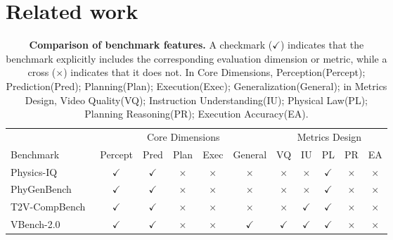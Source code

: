 
\section{Related work}
\label{sec:related}


\newcommand{\cmark}{\textcolor{GreenCheck}{$\checkmark$}}%
\newcommand{\xmark}{\textcolor{RedCross}{$\times$}}%



\begin{table}[!ht]
\centering
\caption{ \textbf{Comparison of benchmark features.}
A checkmark (\cmark) indicates that the benchmark explicitly includes the corresponding evaluation dimension or metric, while a cross (\xmark) indicates that it does not. 
In Core Dimensions, Perception(Percept); Prediction(Pred); Planning(Plan); Execution(Exec); Generalization(General); in Metrics Design, Video Quality(VQ); Instruction Understanding(IU); Physical Law(PL); Planning Reasoning(PR); Execution Accuracy(EA).
}

\label{tab:final_comparison}
\setlength{\tabcolsep}{2.2pt} %
\scriptsize
\begin{tabular}{@{}lcccccccccc@{}}
\toprule
& \multicolumn{5}{c}{{Core Dimensions}} &
  \multicolumn{5}{c}{{Metrics Design}} \\
\cmidrule(lr){2-6}\cmidrule(lr){7-11}
{Benchmark} &
{Percept} & {Pred} & {Plan} & {Exec} & {General} &
{VQ} & {IU} & {PL} & {PR} & {EA} \\
\midrule

Physics\textnormal{-}IQ~\cite{motamed2025generative}         & \cmark & \cmark & \xmark & \xmark & \xmark & \xmark & \xmark & \cmark & \xmark & \xmark \\
PhyGenBench~\cite{meng2024towards}                        & \cmark & \cmark & \xmark & \xmark & \xmark & \xmark & \xmark & \cmark & \xmark & \xmark \\

T2V\textnormal{-}CompBench~\cite{sun2025t2v}        & \cmark & \cmark & \xmark & \xmark & \xmark & \xmark & \cmark & \cmark & \xmark & \xmark \\
VBench\textnormal{-}2.0~\cite{zheng2025vbench}         & \cmark & \cmark & \xmark & \xmark & \cmark & \cmark & \cmark & \cmark & \xmark & \xmark \\


\end{tabular}
\end{table}
